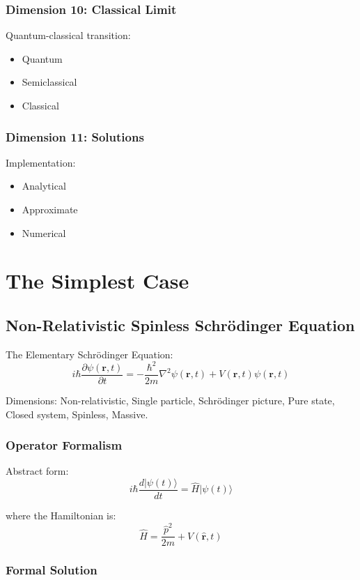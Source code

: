\documentclass[12pt]{book}
\begin{document}
\subsection{Dimension 10: Classical Limit}

Quantum-classical transition:
\begin{itemize}
  \item Quantum
  \item Semiclassical
  \item Classical
\end{itemize}

\subsection{Dimension 11: Solutions}

Implementation:
\begin{itemize}
  \item Analytical
  \item Approximate
  \item Numerical
\end{itemize}

\chapter{The Simplest Case}

\section{Non-Relativistic Spinless Schrödinger Equation}

The Elementary Schrödinger Equation:
$$i\hbar\frac{\partial\psi(\mathbf{r},t)}{\partial t} = -\frac{\hbar^2}{2m}\nabla^2\psi(\mathbf{r},t) + V(\mathbf{r},t)\psi(\mathbf{r},t)$$

Dimensions: Non-relativistic, Single particle, Schrödinger picture, Pure state, Closed system, Spinless, Massive.

\subsection{Operator Formalism}

Abstract form:
$$i\hbar\frac{d|\psi(t)\rangle}{dt} = \hat{H}|\psi(t)\rangle$$

where the Hamiltonian is:
$$\hat{H} = \frac{\hat{p}^2}{2m} + V(\hat{\mathbf{r}},t)$$

\subsection{Formal Solution}
\end{document}

